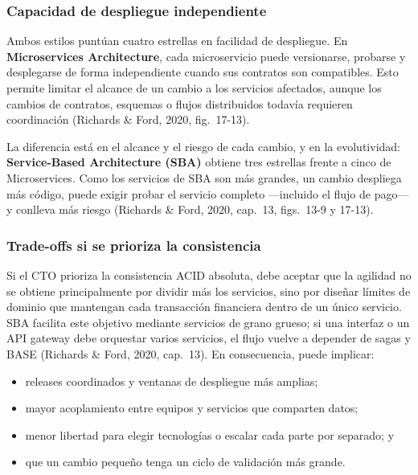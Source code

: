 \subsubsection{Capacidad de despliegue independiente}

Ambos estilos puntúan cuatro estrellas en facilidad de despliegue. En
\textbf{Microservices Architecture}, cada microservicio puede versionarse, probarse y
desplegarse de forma independiente cuando sus contratos son compatibles. Esto
permite limitar el alcance de un cambio a los servicios afectados, aunque los
cambios de contratos, esquemas o flujos distribuidos todavía requieren
coordinación (Richards \& Ford, 2020, fig.~17-13).

La diferencia está en el alcance y el riesgo de cada cambio, y en la
evolutividad: \textbf{Service-Based Architecture (SBA)} obtiene tres estrellas frente
a cinco de Microservices. Como los servicios de SBA son más grandes, un cambio
despliega más código, puede exigir probar el servicio completo ---incluido el flujo
de pago--- y conlleva más riesgo (Richards \& Ford, 2020, cap.~13, figs.~13-9 y
17-13).

\subsubsection{Trade-offs si se prioriza la consistencia}

Si el CTO prioriza la consistencia ACID absoluta, debe aceptar que la agilidad no
se obtiene principalmente por dividir más los servicios, sino por diseñar límites
de dominio que mantengan cada transacción financiera dentro de un único servicio.
SBA facilita este objetivo mediante servicios de grano grueso; si una interfaz o
un API gateway debe orquestar varios servicios, el flujo vuelve a depender de
sagas y BASE (Richards \& Ford, 2020, cap.~13). En consecuencia, puede implicar:

\begin{itemize}
  \item releases coordinados y ventanas de despliegue más amplias;
  \item mayor acoplamiento entre equipos y servicios que comparten datos;
  \item menor libertad para elegir tecnologías o escalar cada parte por separado; y
  \item que un cambio pequeño tenga un ciclo de validación más grande.
\end{itemize}

